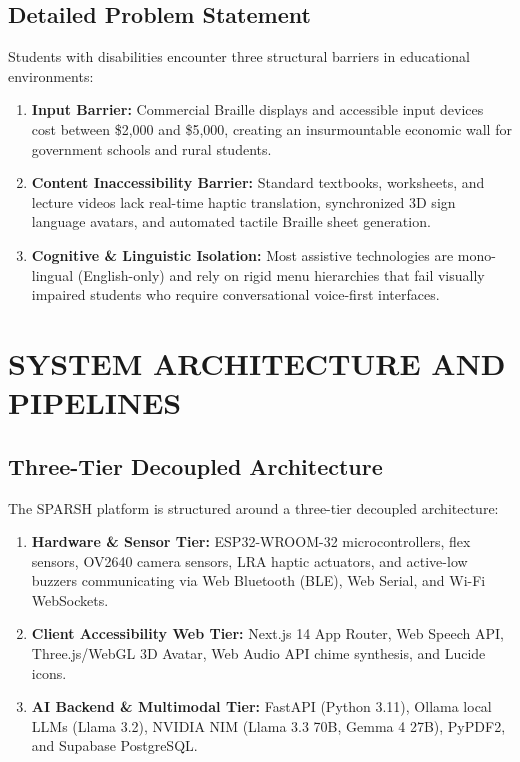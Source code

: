 \documentclass[12pt,a4paper]{report}
\begin{document}
\section{Detailed Problem Statement}
Students with disabilities encounter three structural barriers in educational environments:
\begin{enumerate}
    \item \textbf{Input Barrier:} Commercial Braille displays and accessible input devices cost between \$2,000 and \$5,000, creating an insurmountable economic wall for government schools and rural students.
    \item \textbf{Content Inaccessibility Barrier:} Standard textbooks, worksheets, and lecture videos lack real-time haptic translation, synchronized 3D sign language avatars, and automated tactile Braille sheet generation.
    \item \textbf{Cognitive \& Linguistic Isolation:} Most assistive technologies are mono-lingual (English-only) and rely on rigid menu hierarchies that fail visually impaired students who require conversational voice-first interfaces.
\end{enumerate}

\chapter{SYSTEM ARCHITECTURE AND PIPELINES}

\section{Three-Tier Decoupled Architecture}
The SPARSH platform is structured around a three-tier decoupled architecture:
\begin{enumerate}
    \item \textbf{Hardware \& Sensor Tier:} ESP32-WROOM-32 microcontrollers, flex sensors, OV2640 camera sensors, LRA haptic actuators, and active-low buzzers communicating via Web Bluetooth (BLE), Web Serial, and Wi-Fi WebSockets.
    \item \textbf{Client Accessibility Web Tier:} Next.js 14 App Router, Web Speech API, Three.js/WebGL 3D Avatar, Web Audio API chime synthesis, and Lucide icons.
    \item \textbf{AI Backend \& Multimodal Tier:} FastAPI (Python 3.11), Ollama local LLMs (Llama 3.2), NVIDIA NIM (Llama 3.3 70B, Gemma 4 27B), PyPDF2, and Supabase PostgreSQL.
\end{enumerate}
\end{document}
